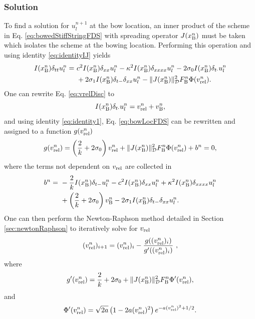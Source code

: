 \subsubsection{Solution}
To find a solution for $u_l^{n+1}$ at the bow location, an inner product of the scheme in Eq. \eqref{eq:bowedStiffStringFDS} with spreading operator $J(x_{\text{B}}^n)$ must be taken which isolates the scheme at the bowing location. Performing this operation and using identity \eqref{eq:identityIJ} yields
\begin{equation}\label{eq:bowLocFDS}
    \begin{aligned}
    I(x_{\text{B}}^n)\delta_{tt}u_l^n =\ &c^2 I(x_{\text{B}}^n)\delta_{xx} u_l^n - \kappa^2 I(x_{\text{B}}^n)\delta_{xxxx} u_l^n- 2 \sigma_{0} I(x_{\text{B}}^n)\delta_{t\cdot} u_l^n\\
    & + 2 \sigma_{1} I(x_{\text{B}}^n)\delta_{t-}\delta_{xx} u_l^n - \lVert J(x_{\text{B}}^n)\rVert^2_{\mathcal{D}} F_{\text{B}}^n\Phi(v_\text{rel}^n).
    \end{aligned}
\end{equation}
One can rewrite Eq. \eqref{eq:vrelDisc} to 
\begin{equation}
   I(x_{\text{B}}^n)\delta_{t\cdot} u_l^n =  v_\text{rel}^n + v_{\text{B}}^n,
\end{equation}
and using identity \eqref{eq:identity1}, Eq. \eqref{eq:bowLocFDS} can be rewritten and assigned to a function $g(v_\text{rel}^n)$ 
\begin{equation}\label{eq:staticFrictionNRfunc}
    g(v_\text{rel}^n) = \left(\frac{2}{k} + 2\sigma_{0}\right)v_\text{rel}^n + \lVert J(x_{\text{B}}^n)\rVert^2_{\mathcal{D}} F_{\text{B}}^n\Phi(v_\text{rel}^n) + b^n = 0,
\end{equation}
where the terms not dependent on $v_\text{rel}$ are collected in
\begin{align*}
    b^n =\ &-\frac{2}{k}I(x_{\text{B}}^n)\delta_{t-} u_l^n-c^2 I(x_{\text{B}}^n)\delta_{xx} u_l^n + \kappa^2 I(x_{\text{B}}^n)\delta_{xxxx} u_l^n \\
    &+ \left( \frac{2}{k} + 2 \sigma_{0} \right)v_{\text{B}}^n - 2 \sigma_{1} I(x_{\text{B}}^n)\delta_{t-}\delta_{xx} u_l^n.
\end{align*}
%
One can then perform the Newton-Raphson method detailed in Section \ref{sec:newtonRaphson} to iteratively solve for $v_\text{rel}$ 
%
\begin{equation}
    (v_\text{rel}^n)_{i+1} = (v_\text{rel}^n)_i - \frac{g((v_\text{rel}^n)_i)}{g'((v_\text{rel}^n)_i)}\ ,
\end{equation}
where
\begin{equation}
    g'(v_\text{rel}^n) = \frac{2}{k} + 2\sigma_{0} + \lVert J(x_{\text{B}}^n)\rVert^2_{\mathcal{D}} F_{\text{B}}^n\Phi'(v_\text{rel}^n),
\end{equation}
and 
\begin{equation*}
    \begin{aligned}
        \Phi'(\vrel^n) %
        = \sqrt{2a}\left(1 - 2a(\vrel^n)^2\right)e^{-a(\vrel^n)^2+1/2}.
    \end{aligned}
\end{equation*}
